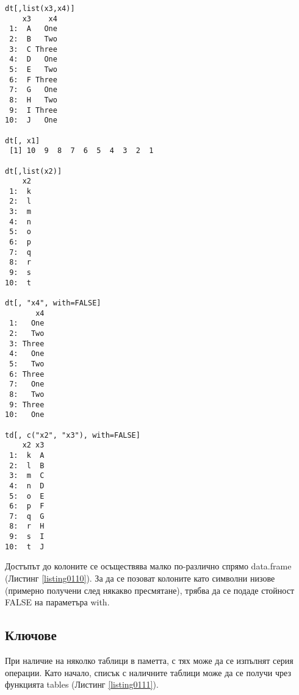 \begin{lstlisting}[caption=Достъп до колоните, label=listing0110]
dt[,list(x3,x4)]
    x3    x4
 1:  A   One
 2:  B   Two
 3:  C Three
 4:  D   One
 5:  E   Two
 6:  F Three
 7:  G   One
 8:  H   Two
 9:  I Three
10:  J   One

dt[, x1]
 [1] 10  9  8  7  6  5  4  3  2  1

dt[,list(x2)]
    x2
 1:  k
 2:  l
 3:  m
 4:  n
 5:  o
 6:  p
 7:  q
 8:  r
 9:  s
10:  t

dt[, "x4", with=FALSE]
       x4
 1:   One
 2:   Two
 3: Three
 4:   One
 5:   Two
 6: Three
 7:   One
 8:   Two
 9: Three
10:   One

td[, c("x2", "x3"), with=FALSE]
    x2 x3
 1:  k  A
 2:  l  B
 3:  m  C
 4:  n  D
 5:  o  E
 6:  p  F
 7:  q  G
 8:  r  H
 9:  s  I
10:  t  J
\end{lstlisting}

Достъпът до колоните се осъществява малко по-различно спрямо data.frame (Листинг \ref{listing0110}). За да се позоват колоните като символни низове (примерно получени след някакво пресмятане), трябва да се подаде стойност FALSE на параметъра with.

\subsection{Ключове}

При наличие на няколко таблици в паметта,  с тях може да се изпълнят серия операции. Като начало, списък с наличните таблици може да се получи чрез функцията tables (Листинг \ref{listing0111}).

